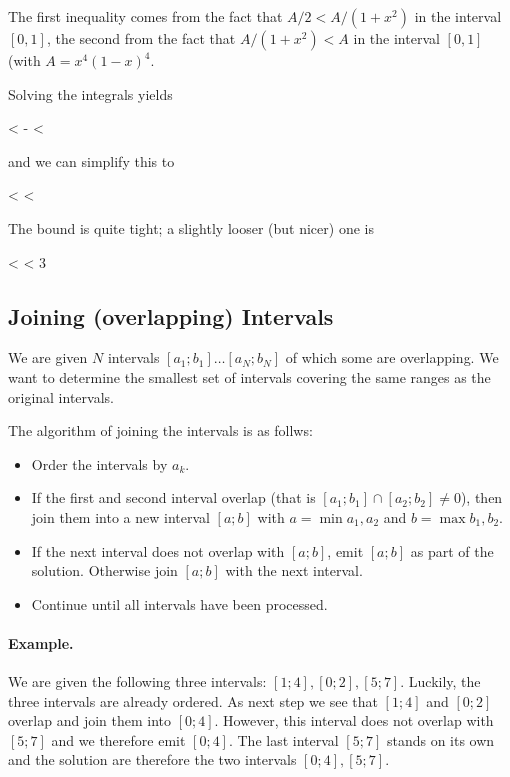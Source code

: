 The first inequality comes from the fact that $A/2 < A/(1+x^2)$ in the interval $[0,1]$, the second from the fact that $A/(1+x^2) < A$ in the interval $[0,1]$ (with $A = x^4(1-x)^4$.

Solving the integrals yields

\bee
{} <   - \pi < 
\eee

and we can simplify this to

\bee
{} < \pi < 
\eee

The bound is quite tight; a slightly looser (but nicer) one is

  < \pi < 3 
\eee




\subsection{Joining (overlapping) Intervals}

We are given $N$ intervals $[a_1; b_1] \ldots [a_N; b_N]$ of which some are overlapping. We want to determine the smallest set of intervals covering the same ranges as the original intervals.

The algorithm of joining the intervals is as follws:

\begin{itemize}
  \item Order the intervals by $a_k$.
  \item If the first and second interval overlap (that is $[a_1; b_1] \cap [a_2; b_2] \neq 0$), then join them into a new interval $[a;b]$ with $a = \min a_1, a_2$ and $b = \max b_1, b_2$.
  \item If the next interval does not overlap with $[a;b]$, emit $[a;b]$ as part of the solution. Otherwise join $[a;b]$ with the next interval.
  \item Continue until all intervals have been processed.
\end{itemize}


\paragraph{Example.} We are given the following three intervals: $[1;4], [0;2], [5;7]$. Luckily, the three intervals are already ordered. As next step we see that $[1;4]$ and $[0;2]$ overlap and join them into $[0;4]$. However, this interval does not overlap with $[5;7]$ and we therefore emit $[0;4]$. The last interval $[5;7]$ stands on its own and the solution are therefore the two intervals $[0;4], [5;7]$.


